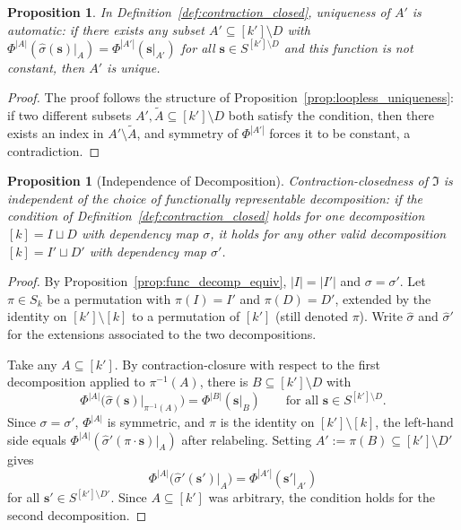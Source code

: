 \documentclass[11pt,reqno]{amsart}
\newcommand{\vecs}{\boldsymbol{s}}
\newcommand{\IFam}{\mathfrak{I}}
\theoremstyle{plain}
\newtheorem{proposition}[theorem]{Proposition}
\theoremstyle{definition}
\numberwithin{equation}{section}
\begin{document}
\begin{proposition}
\label{prop:contraction_closed_uniqueness}
In Definition~\ref{def:contraction_closed}, uniqueness of $A'$ is automatic: if there exists any subset $A' \subseteq [k'] \setminus D$ with $\Phi^{|A|}(\hat\sigma(\vecs)|_A) = \Phi^{|A'|}(\vecs|_{A'})$ for all $\vecs \in S^{[k'] \setminus D}$ and this function is not constant, then $A'$ is unique.
\end{proposition}
\begin{proof}
The proof follows the structure of Proposition~\ref{prop:loopless_uniqueness}: if two different subsets $A', \widetilde{A} \subseteq [k'] \setminus D$ both satisfy the condition, then there exists an index in $A' \setminus \widetilde{A}$, and symmetry of $\Phi^{|A'|}$ forces it to be constant, a contradiction.
\end{proof}

\begin{proposition}[Independence of Decomposition]\label{prop:independence_decomposition}
Contraction-closedness of $\IFam$ is independent of the choice of functionally representable decomposition: if the condition of Definition~\ref{def:contraction_closed} holds for one decomposition $[k] = I \sqcup D$ with dependency map $\sigma$, it holds for any other valid decomposition $[k] = I' \sqcup D'$ with dependency map $\sigma'$.
\end{proposition}
\begin{proof}
By Proposition~\ref{prop:func_decomp_equiv}, $|I| = |I'|$ and $\sigma = \sigma'$. Let $\pi \in S_k$ be a permutation with $\pi(I) = I'$ and $\pi(D) = D'$, extended by the identity on $[k'] \setminus [k]$ to a permutation of $[k']$ (still denoted $\pi$). Write $\hat\sigma$ and $\hat\sigma'$ for the extensions associated to the two decompositions.

Take any $A \subseteq [k']$. By contraction-closure with respect to the first decomposition applied to $\pi^{-1}(A)$, there is $B \subseteq [k'] \setminus D$ with
\[
    \Phi^{|A|}\!\big(\hat\sigma(\vecs)|_{\pi^{-1}(A)}\big) = \Phi^{|B|}(\vecs|_B)
    \qquad \text{for all } \vecs \in S^{[k'] \setminus D}.
\]
Since $\sigma = \sigma'$, $\Phi^{|A|}$ is symmetric, and $\pi$ is the identity on $[k'] \setminus [k]$, the left-hand side equals $\Phi^{|A|}(\hat\sigma'(\pi \cdot \vecs)|_A)$ after relabeling. Setting $A' := \pi(B) \subseteq [k'] \setminus D'$ gives
\[
    \Phi^{|A|}\!\big(\hat\sigma'(\vecs')|_A\big) = \Phi^{|A'|}(\vecs'|_{A'})
\]
for all $\vecs' \in S^{[k'] \setminus D'}$. Since $A \subseteq [k']$ was arbitrary, the condition holds for the second decomposition.
\end{proof}
\end{document}
